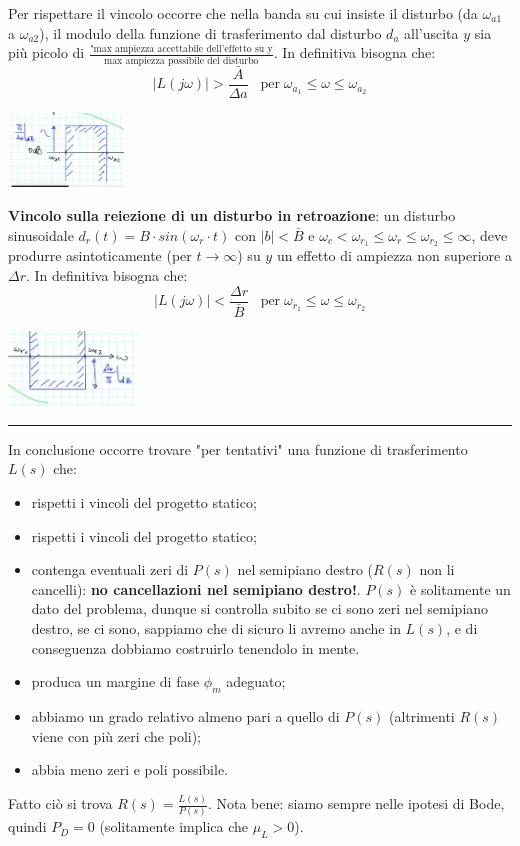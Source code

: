 \begin{landscape}
\begin{multicols*}{3}
    Per rispettare il vincolo occorre che nella banda su cui insiste il disturbo (da $\omega_{a1}$ a $\omega_{a2}$), il modulo della funzione di trasferimento dal disturbo $d_a$ all'uscita $y$ sia più picolo di $\frac{\text{"max ampiezza accettabile dell'effetto su y}}{\text{max ampiezza possibile del disturbo}}$.\newline
    In definitiva bisogna che:
    \[
        |L(j \omega)| > \frac{\bar{A}}{\Delta a} \;\;\;\text{per}\; \omega_{a_1} \leq \omega \leq \omega_{a_2}
    \]
    \begin{center}
        \includegraphics[height=2cm]{../formulario/img8.JPG}
    \end{center}
    \textbf{Vincolo sulla reiezione di un disturbo in retroazione}: un disturbo sinusoidale $d_r(t) = B \cdot  sin(\omega_r \cdot t)$ con $|b| < \bar{B}$ e $\omega_c < \omega_{r_1} \leq \omega_r \leq \omega_{r_2} \leq \infty$, deve produrre asintoticamente (per $t \rightarrow  \infty$) su $y$ un effetto di ampiezza non superiore a $\Delta r$. In definitiva bisogna che:
    \[
        |L(j \omega)| < \frac{\Delta r }{\bar{B}} \;\;\;\text{per}\; \omega_{r_1} \leq \omega \leq \omega_{r_2}
    \]
    \begin{center}
        \includegraphics[height=2cm]{../formulario/img9.JPG}
    \end{center}
    \rule{\textwidth}{0,4pt}
    In conclusione occorre trovare "per tentativi" una funzione di trasferimento $L(s)$ che:
    \begin{itemize}
        \item rispetti i vincoli del progetto statico;
        \item rispetti i vincoli del progetto statico;
        \item contenga eventuali zeri di $P(s)$ nel semipiano destro ($R(s)$ non li cancelli): \textbf{no cancellazioni nel semipiano destro!}. $P(s)$ è solitamente un dato del problema, dunque si controlla subito se ci sono zeri nel semipiano destro, se ci sono, sappiamo che di sicuro li avremo anche in $L(s)$, e di conseguenza dobbiamo costruirlo tenendolo in mente.
        \item produca un margine di fase $\phi_m$ adeguato;
        \item abbiamo un grado relativo almeno pari a quello di $P(s)$ (altrimenti $R(s)$ viene con più zeri che poli);
        \item abbia meno zeri e poli possibile.
    \end{itemize}
    Fatto ciò si trova $R(s) = \frac{L(s)}{P(s)}$.\newline
    Nota bene: siamo sempre nelle ipotesi di Bode, quindi $P_D = 0$ (solitamente implica che $\mu_L > 0$).

\end{multicols*}
\end{landscape}
